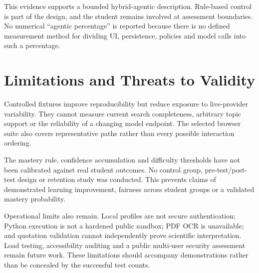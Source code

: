 This evidence supports a bounded hybrid-agentic description. Rule-based control is part of the design, and the student remains involved at assessment boundaries. No numerical ``agentic percentage'' is reported because there is no defined measurement method for dividing UI, persistence, policies and model calls into such a percentage.

\section{Limitations and Threats to Validity}
Controlled fixtures improve reproducibility but reduce exposure to live-provider variability. They cannot measure current search completeness, arbitrary topic support or the reliability of a changing model endpoint. The selected browser suite also covers representative paths rather than every possible interaction ordering.

The mastery rule, confidence accumulation and difficulty thresholds have not been calibrated against real student outcomes. No control group, pre-test/post-test design or retention study was conducted. This prevents claims of demonstrated learning improvement, fairness across student groups or a validated mastery probability.

Operational limits also remain. Local profiles are not secure authentication; Python execution is not a hardened public sandbox; PDF OCR is unavailable; and quotation validation cannot independently prove scientific interpretation. Load testing, accessibility auditing and a public multi-user security assessment remain future work. These limitations should accompany demonstrations rather than be concealed by the successful test counts.
